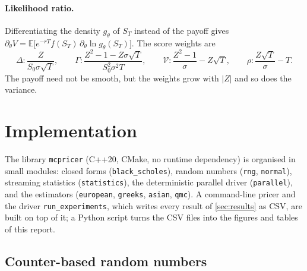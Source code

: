 \documentclass[11pt,a4paper]{article}
\newcommand{\E}{\mathbb{E}}
\newcommand{\1}{\mathbf{1}}
\theoremstyle{plain}
\theoremstyle{remark}
\begin{document}
\paragraph{Likelihood ratio.} Differentiating the density $g_\theta$ of $S_T$ instead of the payoff gives
$\partial_\theta V = \E\big[e^{-rT} f(S_T)\, \partial_\theta \ln g_\theta(S_T)\big]$. The score weights are
\begin{equation}
  \Delta: \frac{Z}{S_0\sigma\sqrt{T}}, \qquad
  \Gamma: \frac{Z^2 - 1 - Z\sigma\sqrt{T}}{S_0^2\sigma^2 T}, \qquad
  \mathcal{V}: \frac{Z^2-1}{\sigma} - Z\sqrt{T}, \qquad
  \rho: \frac{Z\sqrt{T}}{\sigma} - T.
\end{equation}
The payoff need not be smooth, but the weights grow with $|Z|$ and so does the variance.

\section{Implementation}\label{sec:implementation}

The library \texttt{mcpricer} (C++20, CMake, no runtime dependency) is organised in small modules: closed forms
(\texttt{black\_scholes}), random numbers (\texttt{rng}, \texttt{normal}), streaming statistics
(\texttt{statistics}), the deterministic parallel driver (\texttt{parallel}), and the estimators
(\texttt{european}, \texttt{greeks}, \texttt{asian}, \texttt{qmc}). A command-line pricer and the driver
\texttt{run\_experiments}, which writes every result of \cref{sec:results} as CSV, are built on top of it; a
Python script turns the CSV files into the figures and tables of this report.

\subsection{Counter-based random numbers}
\end{document}
